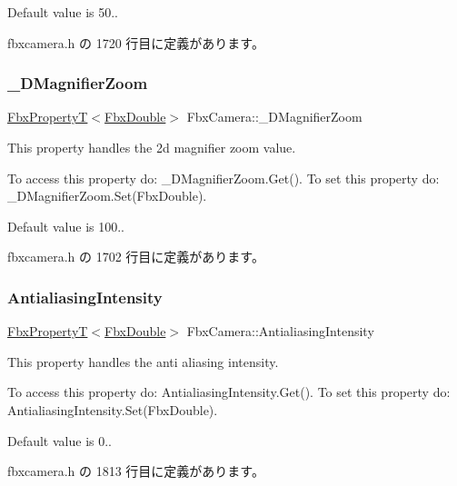 Default value is 50.. 

 fbxcamera.\+h の 1720 行目に定義があります。

\mbox{\label{class_fbx_camera_ab60ab197ebbbf565d18dc7f7b2113f59}} 
\subsubsection{\texorpdfstring{\+\_\+D\+Magnifier\+Zoom}{\_2DMagnifierZoom}}
{\footnotesize\ttfamily \hyperlink{class_fbx_property_t}{Fbx\+PropertyT}$<$\hyperlink{fbxtypes_8h_a171e72a1c46fc15c1a6c9c31948c1c5b}{Fbx\+Double}$>$ Fbx\+Camera\+::\+\_\+D\+Magnifier\+Zoom}

This property handles the 2d magnifier zoom value.

To access this property do\+: \+\_\+D\+Magnifier\+Zoom.\+Get(). To set this property do\+: \+\_\+D\+Magnifier\+Zoom.\+Set(\+Fbx\+Double).

Default value is 100.. 

 fbxcamera.\+h の 1702 行目に定義があります。

\mbox{\label{class_fbx_camera_a3e7ddc27aff98a3850f58d8b800b6613}} 
\subsubsection{\texorpdfstring{Antialiasing\+Intensity}{AntialiasingIntensity}}
{\footnotesize\ttfamily \hyperlink{class_fbx_property_t}{Fbx\+PropertyT}$<$\hyperlink{fbxtypes_8h_a171e72a1c46fc15c1a6c9c31948c1c5b}{Fbx\+Double}$>$ Fbx\+Camera\+::\+Antialiasing\+Intensity}

This property handles the anti aliasing intensity.

To access this property do\+: Antialiasing\+Intensity.\+Get(). To set this property do\+: Antialiasing\+Intensity.\+Set(\+Fbx\+Double).

Default value is 0.. 

 fbxcamera.\+h の 1813 行目に定義があります。

\mbox{\label{class_fbx_camera_a1ad348a909fc9cd51173f5a424660ac1}} 
